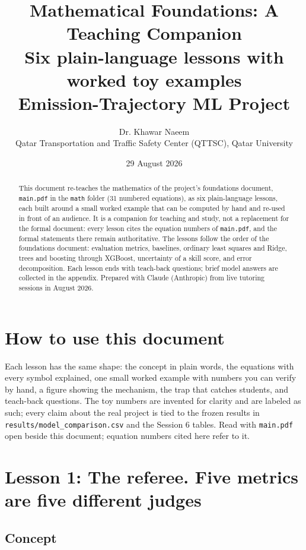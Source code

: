 \documentclass[11pt]{article}
\title{Mathematical Foundations: A Teaching Companion \\
\large Six plain-language lessons with worked toy examples \\
Emission-Trajectory ML Project}
\author{Dr. Khawar Naeem \\ Qatar Transportation and Traffic Safety Center (QTTSC), Qatar University}
\date{29 August 2026}
\begin{document}
\maketitle

\begin{abstract}
This document re-teaches the mathematics of the project's foundations
document, \texttt{main.pdf} in the \texttt{math} folder (31 numbered
equations), as six plain-language lessons, each built around a small worked example that can
be computed by hand and re-used in front of an audience. It is a companion
for teaching and study, not a replacement for the formal document: every
lesson cites the equation numbers of \texttt{main.pdf}, and the formal
statements there remain authoritative. The lessons follow the order of the
foundations document: evaluation metrics, baselines, ordinary least
squares and Ridge, trees and boosting through XGBoost, uncertainty of a
skill score, and error decomposition. Each lesson ends with teach-back
questions; brief model answers are collected in the appendix. Prepared
with Claude (Anthropic) from live tutoring sessions in August 2026.
\end{abstract}

\tableofcontents

\section{How to use this document}

Each lesson has the same shape: the concept in plain words, the equations
with every symbol explained, one small worked example with numbers you can
verify by hand, a figure showing the mechanism, the trap that catches
students, and teach-back questions. The toy numbers are invented for
clarity and are labeled as such; every claim about the real project is
tied to the frozen results in \texttt{results/model\_comparison.csv} and
the Session 6 tables. Read with \texttt{main.pdf} open beside this
document; equation numbers cited here refer to it.

\section{Lesson 1: The referee. Five metrics are five different judges}

\subsection{Concept}
\end{document}
